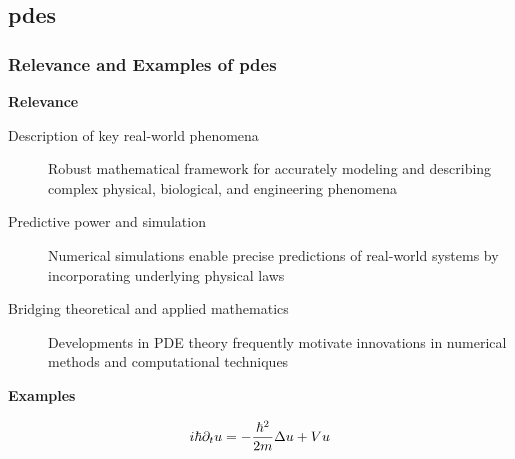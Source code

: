 \subsection{\texorpdfstring{\acrlong{pdes}}{}}

\begin{frame}
    \frametitle{Relevance and Examples of \acrfull{pdes}}

    \vspace*{\fill}
    \begin{center}
        {\color{\accentcolor} \Large \textbf{Relevance}}
    \end{center}

    \vspace*{0.125cm}

    \begin{center}
        \begin{minipage}{0.75\textwidth}
            \begin{description}
                \item[Description of key real-world phenomena] Robust mathematical framework for accurately modeling and describing complex physical, biological, and engineering phenomena
                \item[Predictive power and simulation] Numerical simulations enable precise predictions of real-world systems by incorporating underlying physical laws
                \item[Bridging theoretical and applied mathematics] Developments in PDE theory frequently motivate innovations in numerical methods and computational techniques
            \end{description}
        \end{minipage}
    \end{center}

    \vspace*{\fill}

    \begin{center}
        {\color{\accentcolor} \Large \textbf{Examples}}
    \end{center}

    \begin{multicols}{3}

        \begin{center}
            \begin{align*}
                i \hbar \partial_t u = - \frac{\hbar^2}{2 m} \Delta u + V u
            \end{align*}
            

\end{center}
\end{multicols}
\end{frame}
